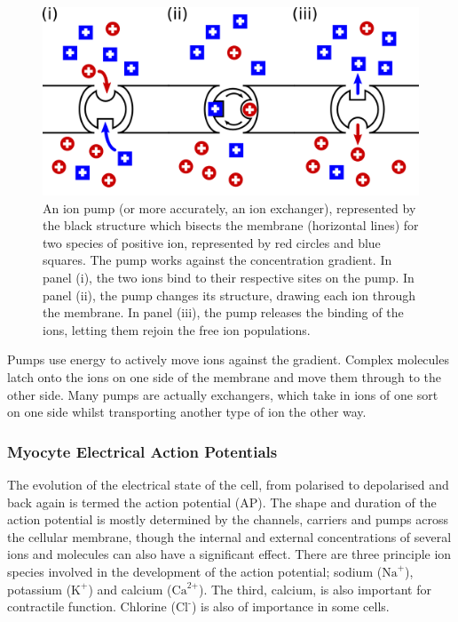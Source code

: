 \begin{figure}
\begin{center}
\includegraphics{figures/intro/ion_pump}
\end{center}
\caption[Ion Pump]{
\label{fig:intro:heart:ion_pump}
An ion pump (or more accurately, an ion exchanger), represented by the black
structure which bisects the membrane (horizontal lines) for two species of
positive ion, represented by red circles and blue squares.
The pump works against the concentration gradient.
In panel (i), the two ions bind to their respective sites on the pump.
In panel (ii), the pump changes its structure, drawing each ion through the
membrane.
In panel (iii), the pump releases the binding of the ions, letting them rejoin
the free ion populations.
}
\end{figure}
Pumps use energy to actively move ions against the gradient.
Complex molecules latch onto the ions on one side of the membrane and move them
through to the other side.
Many pumps are actually exchangers, which take in ions of one sort on one side
whilst transporting another type of ion the other way.

\subsubsection{Myocyte Electrical Action Potentials}

The evolution of the electrical state of the cell, from polarised to depolarised
and back again is termed the action potential (AP).
The shape and duration of
the action potential is mostly determined by the channels, carriers and pumps
across the cellular membrane, though the internal and external concentrations of
several ions and molecules can also have a significant effect.
There are three
principle ion species involved in the development of the action potential;
sodium ($\text{Na}^{\text{+}}$), potassium ($\text{K}^{\text{+}}$) and calcium
($\text{Ca}^{\text{2+}}$).
The third, calcium, is also important for contractile function.
Chlorine ($\text{Cl}^{\text{-}}$) is also of importance in some cells.

